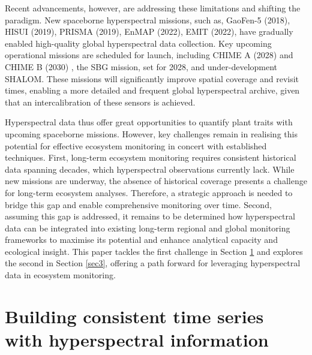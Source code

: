 \documentclass[pdflatex,sn-mathphys-num]{sn-jnl}%
\theoremstyle{thmstyleone}%
\theoremstyle{thmstyletwo}%
\theoremstyle{thmstylethree}%
\begin{document}
Recent advancements, however, are addressing these limitations and shifting the paradigm. New spaceborne hyperspectral missions, such as\cite{alonso2019data}, GaoFen-5 (2018)\cite{liu2019advanced}, HISUI (2019)\cite{iwasaki2011hyperspectral}, PRISMA (2019)\cite{loizzo2019prisma}, EnMAP (2022)\cite{guanter2015enmap}, EMIT (2022), have gradually enabled high-quality global hyperspectral data collection. Key upcoming operational missions are scheduled for launch, including CHIME A (2028) and CHIME B (2030) \cite{nieke2018towards}, the SBG mission\cite{cawse2021nasa}, set for 2028, and under-development SHALOM\cite{feingersh2015shalom}. These missions will significantly improve spatial coverage and revisit times, enabling a more detailed and frequent global hyperspectral archive, given that an intercalibration of these sensors is achieved. %
 

Hyperspectral data thus offer great opportunities to quantify plant traits with upcoming spaceborne missions. However, key challenges remain in realising this potential for effective ecosystem monitoring in concert with established techniques.
First, long-term ecosystem monitoring requires consistent historical data spanning decades, which hyperspectral observations currently lack. While new missions are underway, the absence of historical coverage presents a challenge for long-term ecosystem analyses. Therefore, a strategic approach is needed to bridge this gap and enable comprehensive monitoring over time.
Second, assuming this gap is addressed, it remains to be determined how hyperspectral data can be integrated into existing long-term regional and global monitoring frameworks to maximise its potential and enhance analytical capacity and ecological insight.
This paper tackles the first challenge in Section \ref{sec2} and explores the second in Section \ref{sec3}, offering a path forward for leveraging hyperspectral data in ecosystem monitoring.


\section{Building consistent time series with hyperspectral information} \label{sec2}
\end{document}
